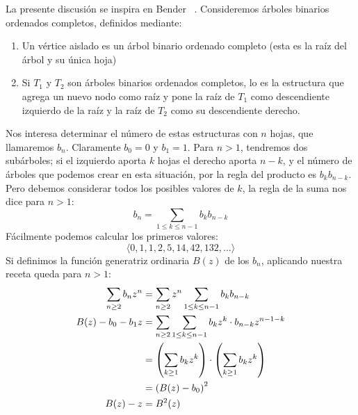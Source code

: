   La presente discusión se inspira en Bender~%
    \cite{bender06:_found_combin_applic}.
  Consideremos árboles binarios ordenados completos,%
  definidos mediante:
  \begin{enumerate}[label=(\roman*), ref=\roman*]
  \item
    Un vértice aislado es un árbol binario ordenado completo
    (esta es la raíz del árbol y su única hoja)
  \item
    Si \(T_1\) y \(T_2\) son árboles binarios ordenados completos,
    lo es la estructura que agrega un nuevo nodo como raíz
    y pone la raíz de \(T_1\) como descendiente izquierdo de la raíz
    y la raíz de \(T_2\) como su descendiente derecho.
  \end{enumerate}
  Nos interesa determinar
  el número de estas estructuras con \(n\) hojas,
  que llamaremos \(b_n\).
  Claramente \(b_0 = 0\) y \(b_1 = 1\).
  Para \(n > 1\),
  tendremos dos subárboles;
  si el izquierdo aporta \(k\) hojas
  el derecho aporta \(n - k\),
  y el número de árboles que podemos crear en esta situación,
  por la regla del producto es
  \(b_k b_{n - k}\).
  Pero debemos considerar todos los posibles valores de \(k\),
  la regla de la suma nos dice para \(n > 1\):
  \begin{equation}
    \label{eq:UFBRPT-recurrence}
    b_n
      = \sum_{1 \le k \le n - 1} b_k b_{n - k}
  \end{equation}
  Fácilmente podemos calcular los primeros valores:
  \begin{equation}
    \label{eq:UFBRPT-values}
    \langle 0, 1, 1, 2, 5, 14, 42, 132, \dotsc \rangle
  \end{equation}
  Si definimos
  la función generatriz ordinaria \(B(z)\) de los \(b_n\),
  aplicando nuestra receta queda para \(n > 1\):
  \begin{align}
    \sum_{n \ge 2} b_n z^n
      &= \sum_{n \ge 2} z^n \sum_{1 \le k \le n - 1} b_k b_{n - k}
				  \notag \\
    B(z) - b_0 - b_1 z
      &= \sum_{n \ge 2}
	   \sum_{1 \le k \le n - 1}
	     b_k z^k \cdot b_{n - k} z^{n - 1 - k}
				  \notag \\
      &= \left( \sum_{k \ge 1} b_k z^k \right)
	    \cdot \left( \sum_{k \ge 1} b_k z^k \right)
				  \notag \\
      &= \left( B(z) - b_0 \right)^2
				  \notag \\
    B(z) - z
      &= B^2(z)
				  \label{eq:UFBRPT-functional}
  \end{align}
